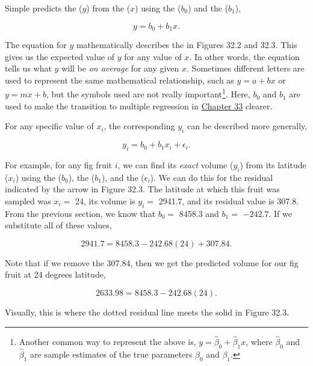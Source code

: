 \documentclass[
  openany]{krantz}
\begin{document}
Simple  predicts the  (\(y\)) from the  (\(x\)) using the  (\(b_{0}\)) and the  (\(b_{1}\)),

\[y = b_{0} + b_{1}x.\]

The equation for \(y\) mathematically describes the  in Figures 32.2 and 32.3.
This gives us the expected value of \(y\) for any value of \(x\).
In other words, the equation tells us what \(y\) will be \emph{on average} for any given \(x\).
Sometimes different letters are used to represent the same mathematical relationship, such as \(y = a + bx\) or \(y = mx + b\), but the symbols used are not really important\footnote{Another common way to represent the above is, \(y = \hat{\beta}_{0} + \hat{\beta}_{1}x\), where \(\hat{\beta}_{0}\) and \(\hat{\beta}_{1}\) are sample estimates of the true parameters \({\beta}_{0}\) and \({\beta}_{1}\).}.
Here, \(b_{0}\) and \(b_{1}\) are used to make the transition to multiple regression in \protect\hyperlink{Chapter_33}{Chapter 33} clearer.

For any specific value of \(x_{i}\), the corresponding \(y_{i}\) can be described more generally,

\[y_{i} = b_{0} + b_{1}x_{i} + \epsilon_{i}.\]

For example, for any fig fruit \(i\), we can find its \emph{exact} volume (\(y_{i}\)) from its latitude (\(x_{i}\)) using the  (\(b_{0}\)), the  (\(b_{1}\)), and the  (\(\epsilon_{i}\)).
We can do this for the residual indicated by the arrow in Figure 32.3.
The latitude at which this fruit was sampled was \(x_{i} =\) 24, its volume is \(y_{i} =\) 2941.7, and its residual value is 307.8.
From the previous section, we know that \(b_{0} =\) 8458.3 and \(b_{1} =\) \(-242.7\).
If we substitute all of these values,

\[2941.7 = 8458.3 - 242.68(24) + 307.84.\]

Note that if we remove the  307.84, then we get the predicted volume for our fig fruit at 24 degrees latitude,

\[2633.98 = 8458.3 - 242.68(24).\]

Visually, this is where the dotted residual line meets the solid  in Figure 32.3.
\end{document}
